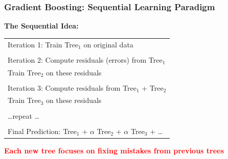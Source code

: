\documentclass{beamer}
\begin{document}
\begin{frame}[fragile]
\frametitle{Gradient Boosting: Sequential Learning Paradigm}

\textbf{The Sequential Idea:}

\begin{center}
{\small
\begin{tabular}{l}
Iteration 1: Train Tree$_1$ on original data \\
\\
Iteration 2: Compute residuals (errors) from Tree$_1$ \\
\quad\quad\quad\quad Train Tree$_2$ on these residuals \\
\\
Iteration 3: Compute residuals from Tree$_1$ + Tree$_2$ \\
\quad\quad\quad\quad Train Tree$_3$ on these residuals \\
\\
\ldots repeat \ldots \\
\\
Final Prediction: Tree$_1$ + $\alpha$ Tree$_2$ + $\alpha$ Tree$_3$ + \ldots
\end{tabular}
}
\end{center}

\vspace{0.3cm}
\begin{center}
\textbf{\textcolor{red}{Each new tree focuses on fixing mistakes from previous trees}}
\end{center}

\end{frame}
\end{document}
